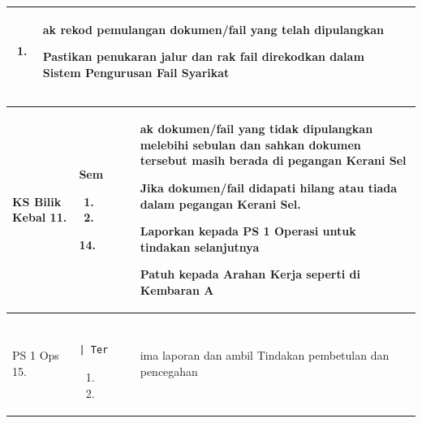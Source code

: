 \documentclass[
]{article}
\begin{document}
\begin{longtable}[]{@{}lll@{}}
\begin{minipage}[t]{0.30\columnwidth}
\begin{enumerate}
\def\labelenumi{\arabic{enumi}.}
\setcounter{enumi}{9}
\item
\end{enumerate}\strut
\end{minipage} & \begin{minipage}[t]{0.30\columnwidth}\raggedright
ak rekod pemulangan dokumen/fail yang telah dipulangkan

Pastikan penukaran jalur dan rak fail direkodkan dalam Sistem Pengurusan
Fail Syarikat\strut
\end{minipage}\tabularnewline
\bottomrule
\end{longtable}

\begin{longtable}[]{@{}lll@{}}
\toprule
\begin{minipage}[b]{0.30\columnwidth}\raggedright
KS Bilik Kebal \textbar{} 11.\strut
\end{minipage} & \begin{minipage}[b]{0.30\columnwidth}\raggedright
Sem

\begin{enumerate}
\def\labelenumi{\arabic{enumi}.}
\setcounter{enumi}{11}
\item
\item
\end{enumerate}

14.\strut
\end{minipage} & \begin{minipage}[b]{0.30\columnwidth}\raggedright
ak dokumen/fail yang tidak dipulangkan melebihi sebulan dan sahkan
dokumen tersebut masih berada di pegangan Kerani Sel

Jika dokumen/fail didapati hilang atau tiada dalam pegangan Kerani Sel.

Laporkan kepada PS 1 Operasi untuk tindakan selanjutnya

Patuh kepada Arahan Kerja seperti di Kembaran A\strut
\end{minipage}\tabularnewline
\midrule
\endhead
\begin{minipage}[t]{0.30\columnwidth}\raggedright
PS 1 Ops \textbar{} 15.\strut
\end{minipage} & \begin{minipage}[t]{0.30\columnwidth}\raggedright
\begin{verbatim}
              | Ter
\end{verbatim}

\begin{enumerate}
\def\labelenumi{\arabic{enumi}.}
\setcounter{enumi}{15}
\item
\item
\end{enumerate}\strut
\end{minipage} & \begin{minipage}[t]{0.30\columnwidth}\raggedright
ima laporan dan ambil Tindakan pembetulan dan pencegahan


\end{minipage}
\end{longtable}
\end{document}
